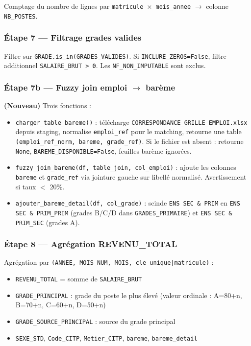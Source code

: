 \documentclass[12pt,a4paper,french]{report}
\begin{document}
Comptage du nombre de lignes par \texttt{matricule $\times$ mois\_annee}
$\rightarrow$ colonne \texttt{NB\_POSTES}.

\subsubsection{Étape 7 — Filtrage grades valides}

Filtre sur \texttt{GRADE.is\_in(GRADES\_VALIDES)}.
Si \texttt{INCLURE\_ZEROS=False}, filtre additionnel \texttt{SALAIRE\_BRUT > 0}.
Les \texttt{NF\_NON\_IMPUTABLE} sont exclus.

\subsubsection{Étape 7b — Fuzzy join emploi $\rightarrow$ barème}

\textbf{(Nouveau)} Trois fonctions :
\begin{itemize}
  \item \texttt{charger\_table\_bareme()} : télécharge
        \texttt{CORRESPONDANCE\_GRILLE\_EMPLOI.xlsx} depuis staging, normalise
        \texttt{emploi\_ref} pour le matching, retourne une table
        \texttt{(emploi\_ref\_norm, bareme, grade\_ref)}. Si le fichier est
        absent : retourne \texttt{None}, \texttt{BAREME\_DISPONIBLE=False},
        feuilles barème ignorées.
  \item \texttt{fuzzy\_join\_bareme(df, table\_join, col\_emploi)} : ajoute les
        colonnes \texttt{bareme} et \texttt{grade\_ref} via jointure gauche sur
        libellé normalisé. Avertissement si taux $<$ 20\%.
  \item \texttt{ajouter\_bareme\_detail(df, col\_grade)} : scinde
        \texttt{ENS SEC \& PRIM} en \texttt{ENS SEC \& PRIM\_PRIM} (grades B/C/D
        dans \texttt{GRADES\_PRIMAIRE}) et \texttt{ENS SEC \& PRIM\_SEC} (grades A).
\end{itemize}

\subsubsection{Étape 8 — Agrégation REVENU\_TOTAL}

Agrégation par \texttt{(ANNEE, MOIS\_NUM, MOIS, cle\_unique|matricule)} :
\begin{itemize}[nosep]
  \item \texttt{REVENU\_TOTAL} = somme de \texttt{SALAIRE\_BRUT}
  \item \texttt{GRADE\_PRINCIPAL} : grade du poste le plus élevé (valeur
        ordinale : A=80+n, B=70+n, C=60+n, D=50+n)
  \item \texttt{GRADE\_SOURCE\_PRINCIPAL} : source du grade principal
  \item \texttt{SEXE\_STD}, \texttt{Code\_CITP}, \texttt{Metier\_CITP},
        \texttt{bareme}, \texttt{bareme\_detail}
\end{itemize}
\end{document}
